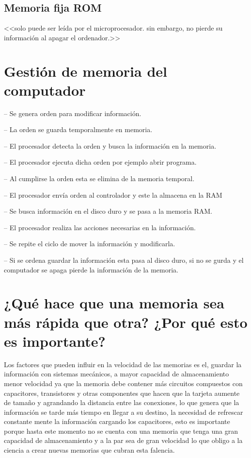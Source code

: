 \documentclass{article}
\begin{document}
\subsection{Memoria fija ROM  }
<<solo puede ser leída por el microprocesador. sin embargo, no pierde su información al apagar el ordenador.>> \cite{transistores}


\section{Gestión de memoria del computador}


-- Se genera orden para modificar información.

-- La orden se guarda temporalmente en memoria.

-- El procesador detecta la orden y busca la información en la memoria. 

-- El procesador ejecuta dicha orden por ejemplo abrir programa. 

-- Al cumplirse la orden esta se elimina de la memoria temporal.

-- El procesador envía orden al controlador y este la almacena en la RAM

-- Se busca información en el disco duro y se pasa a la memoria RAM.

-- El procesador realiza las acciones necesarias en la información. 

-- Se repite el ciclo de mover la información y modificarla. 

-- Si se ordena guardar la información esta pasa al disco duro, si no se gurda y el computador se apaga pierde la información de la memoria.\cite{computadores}


\section{¿Qué hace que una memoria sea más rápida que otra? ¿Por qué esto es importante?}

Los factores que pueden influir en la velocidad de las memorias es el, guardar la información con sistemas mecánicos, a mayor capacidad de almacenamiento menor velocidad ya que la memoria debe contener más circuitos compuestos con capacitores, transistores y otras componentes que hacen que la tarjeta aumente de tamaño y agrandando   la distancia entre las conexiones, lo que genera que la información se tarde más tiempo en llegar a su destino, la necesidad de refrescar constante mente la información cargando los capacitores, esto es importante porque hasta este momento no se cuenta con una memoria que tenga una gran capacidad de almacenamiento y a la par sea de gran velocidad lo que obligo a la ciencia a crear nuevas memorias que cubran esta falencia. 
\end{document}
